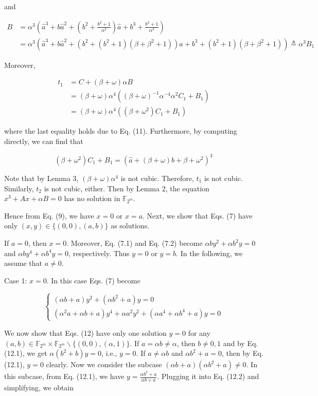 \documentclass[10pt]{article}
\begin{document}
and

$$
\begin{aligned}
B & =\alpha^{3}\left(\hat{a}^{3}+b \hat{a}^{2}+\left(b^{2}+\frac{b^{2}+1}{\alpha^{2}}\right) \hat{a}+b^{3}+\frac{b^{2}+1}{\alpha^{2}}\right) \\
& =\alpha^{3}\left(\hat{a}^{3}+b \hat{a}^{2}+\left(b^{2}+\left(b^{2}+1\right)\left(\beta+\beta^{2}+1\right)\right) \hat{a}+b^{3}+\left(b^{2}+1\right)\left(\beta+\beta^{2}+1\right)\right) \triangleq \alpha^{3} B_{1}
\end{aligned}
$$

Moreover,

$$
\begin{aligned}
t_{1} & =C+(\beta+\omega) \alpha B \\
& =(\beta+\omega) \alpha^{4}\left((\beta+\omega)^{-1} \alpha^{-4} \alpha^{2} C_{1}+B_{1}\right) \\
& =(\beta+\omega) \alpha^{4}\left(\left(\beta+\omega^{2}\right) C_{1}+B_{1}\right)
\end{aligned}
$$

where the last equality holds due to Eq. (11). Furthermore, by computing directly, we can find that

$$
\left(\beta+\omega^{2}\right) C_{1}+B_{1}=\left(\hat{a}+(\beta+\omega) b+\beta+\omega^{2}\right)^{3}
$$

Note that by Lemma 3, $(\beta+\omega) \alpha^{4}$ is not cubic. Therefore, $t_{1}$ is not cubic. Similarly, $t_{2}$ is not cubic, either. Then by Lemma 2, the equation $x^{3}+A x+\alpha B=0$ has no solution in $\mathbb{F}_{2^{m}}$.

Hence from Eq. (9), we have $x=0$ or $x=a$. Next, we show that Eqs. (7) have only $(x, y) \in\{(0,0),(a, b)\}$ as solutions.

If $a=0$, then $x=0$. Moreover, Eq. (7.1) and Eq. (7.2) become $\alpha b y^{2}+\alpha b^{2} y=0$ and $\alpha b y^{4}+\alpha b^{4} y=0$, respectively. Thus $y=0$ or $y=b$. In the following, we assume that $a \neq 0$.

Case 1: $x=0$. In this case Eqs. (7) become

\[
\left\{\begin{array}{l}
(\alpha b+a) y^{2}+\left(\alpha b^{2}+a\right) y=0  \tag{12.1}\\
\left(\alpha^{2} a+\alpha b+a\right) y^{4}+\alpha a^{2} y^{2}+\left(\alpha a^{4}+\alpha b^{4}+a\right) y=0
\end{array}\right.
\]

We now show that Eqs. (12) have only one solution $y=0$ for any $(a, b) \in \mathbb{F}_{2^{m}} \times \mathbb{F}_{2^{m}} \backslash\{(0,0),(\alpha, 1)\}$. If $a=\alpha b \neq \alpha$, then $b \neq 0,1$ and by Eq. (12.1), we get $\alpha\left(b^{2}+b\right) y=0$, i.e., $y=0$. If $a \neq \alpha b$ and $\alpha b^{2}+a=0$, then by Eq. (12.1), $y=0$ clearly. Now we consider the subcase $(\alpha b+a)\left(\alpha b^{2}+a\right) \neq 0$. In this subcase, from Eq. (12.1), we have $y=\frac{\alpha b^{2}+a}{\alpha b+a}$. Plugging it into Eq. (12.2) and simplifying, we obtain
\end{document}
